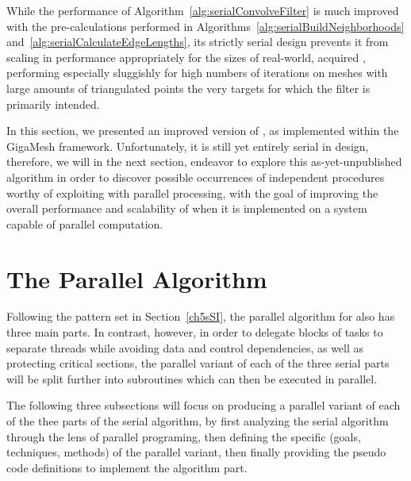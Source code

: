 While the performance of Algorithm~\ref{alg:serialConvolveFilter} is much improved with the pre-calculations performed in Algorithms~\ref{alg:serialBuildNeighborhoods} and~\ref{alg:serialCalculateEdgeLengths}, its strictly serial design prevents it from scaling in performance appropriately for the sizes of real-world, acquired \tdd{}, performing especially sluggishly for high numbers of iterations on meshes with large amounts of triangulated points the very targets for which the filter is primarily intended.

In this section, we presented an improved version of , as implemented within the GigaMesh framework. Unfortunately, it is still yet entirely serial in design, therefore, we will in the next section, endeavor to explore this as-yet-unpublished algorithm in order to discover possible occurrences of independent procedures worthy of exploiting with parallel processing, with the goal of improving the overall performance and scalability of  when it is implemented on a system capable of parallel computation.


%
%
%
%
\section{The Parallel Algorithm}
\label{ch5sPA}
Following the pattern set in Section~\ref{ch5sSI}, the parallel algorithm for  also has three main parts. In contrast, however, in order to delegate blocks of tasks to separate threads while avoiding data and control dependencies, as well as protecting critical sections, the parallel variant of each of the three serial parts will be split further into subroutines which can then be executed in parallel.

The following three subsections will focus on producing a parallel variant of each of the thee parts of the serial algorithm, by first analyzing the serial algorithm through the lens of parallel programing, then defining the specific (goals, techniques, methods) of the parallel variant, then finally providing the pseudo code definitions to implement the algorithm part.


%
%
